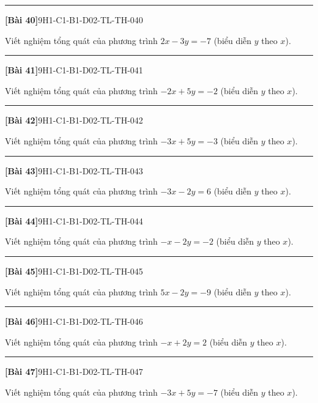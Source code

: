 \documentclass[12pt,a4paper]{article}
\newif\ifloigiai
\newenvironment{cauhoi}[2]{%
  \par\medskip\noindent\rule{\textwidth}{0.4pt}\par\nopagebreak
  \noindent\textbf{[#1]}\hfill{\scriptsize\ttfamily #2}\par\nopagebreak\smallskip}{\par}
\newcommand{\loigiai}[1]{\ifloigiai\par\smallskip\noindent\textit{Lời giải.} #1\par\fi}
\begin{document}
\begin{cauhoi}{Bài 40}{9H1-C1-B1-D02-TL-TH-040}
Viết nghiệm tổng quát của phương trình $2x-3y=-7$ (biểu diễn $y$ theo $x$).
\loigiai{Ta có $-3y=-7-2x$ nên $y=\dfrac{2}{3}x+\dfrac{7}{3}$. Nghiệm tổng quát là $(x;\,\dfrac{2}{3}x+\dfrac{7}{3})$ với $x\in\mathbb R$.}
\end{cauhoi}
\begin{cauhoi}{Bài 41}{9H1-C1-B1-D02-TL-TH-041}
Viết nghiệm tổng quát của phương trình $-2x+5y=-2$ (biểu diễn $y$ theo $x$).
\loigiai{Ta có $5y=-2+2x$ nên $y=\dfrac{2}{5}x-\dfrac{2}{5}$. Nghiệm tổng quát là $(x;\,\dfrac{2}{5}x-\dfrac{2}{5})$ với $x\in\mathbb R$.}
\end{cauhoi}
\begin{cauhoi}{Bài 42}{9H1-C1-B1-D02-TL-TH-042}
Viết nghiệm tổng quát của phương trình $-3x+5y=-3$ (biểu diễn $y$ theo $x$).
\loigiai{Ta có $5y=-3+3x$ nên $y=\dfrac{3}{5}x-\dfrac{3}{5}$. Nghiệm tổng quát là $(x;\,\dfrac{3}{5}x-\dfrac{3}{5})$ với $x\in\mathbb R$.}
\end{cauhoi}
\begin{cauhoi}{Bài 43}{9H1-C1-B1-D02-TL-TH-043}
Viết nghiệm tổng quát của phương trình $-3x-2y=6$ (biểu diễn $y$ theo $x$).
\loigiai{Ta có $-2y=6+3x$ nên $y=-\dfrac{3}{2}x-3$. Nghiệm tổng quát là $(x;\,-\dfrac{3}{2}x-3)$ với $x\in\mathbb R$.}
\end{cauhoi}
\begin{cauhoi}{Bài 44}{9H1-C1-B1-D02-TL-TH-044}
Viết nghiệm tổng quát của phương trình $-x-2y=-2$ (biểu diễn $y$ theo $x$).
\loigiai{Ta có $-2y=-2+x$ nên $y=-\dfrac{1}{2}x+1$. Nghiệm tổng quát là $(x;\,-\dfrac{1}{2}x+1)$ với $x\in\mathbb R$.}
\end{cauhoi}
\begin{cauhoi}{Bài 45}{9H1-C1-B1-D02-TL-TH-045}
Viết nghiệm tổng quát của phương trình $5x-2y=-9$ (biểu diễn $y$ theo $x$).
\loigiai{Ta có $-2y=-9-5x$ nên $y=\dfrac{5}{2}x+\dfrac{9}{2}$. Nghiệm tổng quát là $(x;\,\dfrac{5}{2}x+\dfrac{9}{2})$ với $x\in\mathbb R$.}
\end{cauhoi}
\begin{cauhoi}{Bài 46}{9H1-C1-B1-D02-TL-TH-046}
Viết nghiệm tổng quát của phương trình $-x+2y=2$ (biểu diễn $y$ theo $x$).
\loigiai{Ta có $2y=2+x$ nên $y=\dfrac{1}{2}x+1$. Nghiệm tổng quát là $(x;\,\dfrac{1}{2}x+1)$ với $x\in\mathbb R$.}
\end{cauhoi}
\begin{cauhoi}{Bài 47}{9H1-C1-B1-D02-TL-TH-047}
Viết nghiệm tổng quát của phương trình $-3x+5y=-7$ (biểu diễn $y$ theo $x$).
\loigiai{Ta có $5y=-7+3x$ nên $y=\dfrac{3}{5}x-\dfrac{7}{5}$. Nghiệm tổng quát là $(x;\,\dfrac{3}{5}x-\dfrac{7}{5})$ với $x\in\mathbb R$.}
\end{cauhoi}
\end{document}
